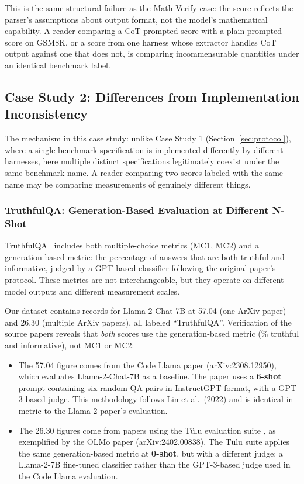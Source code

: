 \documentclass[11pt]{article}
\begin{document}
This is the same structural failure as the Math-Verify case: the score
reflects the parser's assumptions about output format, not the model's
mathematical capability. A reader comparing a CoT-prompted score with a
plain-prompted score on GSM8K, or a score from one harness whose extractor
handles CoT output against one that does not, is comparing incommensurable
quantities under an identical benchmark label.

\subsection{Case Study 2: Differences from Implementation Inconsistency}
\label{sec:onenametwo}

The mechanism in this case study: unlike Case Study 1 (Section~\ref{sec:protocol}),
where a single benchmark specification is implemented differently by
different harnesses, here multiple distinct specifications legitimately
coexist under the same benchmark name. A reader comparing two scores labeled
with the same name may be comparing measurements of genuinely different things.

\subsubsection{TruthfulQA: Generation-Based Evaluation at Different N-Shot}
\label{sec:truthfulqa}

TruthfulQA~\cite{lin2022truthfulqa} includes both multiple-choice metrics
(MC1, MC2) and a generation-based metric: the percentage of answers that are
both truthful and informative, judged by a GPT-based classifier following the
original paper's protocol. These metrics are not interchangeable, but they operate
on different model outputs and different measurement scales.

Our dataset contains records for Llama-2-Chat-7B at 57.04 (one ArXiv paper)
and 26.30 (multiple ArXiv papers), all labeled ``TruthfulQA''. Verification
of the source papers reveals that \emph{both} scores use the generation-based
metric (\% truthful and informative), not MC1 or MC2:

\begin{itemize}
  \item The 57.04 figure comes from the Code Llama paper
    \citep{roziere2023codellama} (arXiv:2308.12950), which evaluates
    Llama-2-Chat-7B as a baseline. The paper uses a \textbf{6-shot} prompt
    containing six random QA pairs in InstructGPT format, with a GPT-3-based
    judge. This methodology follows Lin et al.\ (2022) and is identical in
    metric to the Llama 2 paper's evaluation.
  \item The 26.30 figures come from papers using the Tülu evaluation suite
    \citep{ivison2023camels}, as exemplified by the OLMo paper
    \citep{groeneveld2024olmo} (arXiv:2402.00838). The Tülu suite applies the
    same generation-based metric at \textbf{0-shot}, but with a different judge:
    a Llama-2-7B fine-tuned classifier rather than the GPT-3-based judge used
    in the Code Llama evaluation.
\end{itemize}
\end{document}
